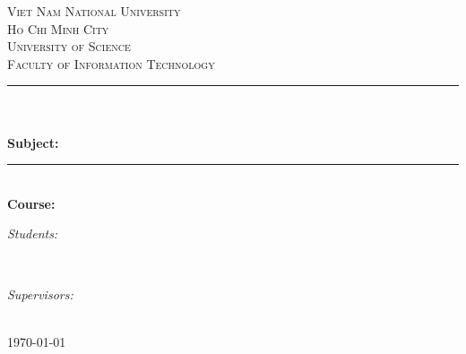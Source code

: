 \begin{titlepage}
\newcommand{\HRule}{\rule{\linewidth}{0.5mm}}
\centering

\textsc{\LARGE Viet Nam National University}\\[0.5cm]
\textsc{\LARGE Ho Chi Minh City}\\[0.5cm]
\textsc{\Large University of Science}\\[0.5cm]
\textsc{\large Faculty of Information Technology}\\[0.5cm]

\HRule \\[0.4cm]
{ 
\huge{\bfseries{\reporttitle}}\\[0.5cm]
\large{\bfseries{Subject: \reportname}}
}\\[0.4cm]
\HRule \\[0.5cm]

\textbf{\large Course: \coursename}\\[0.5cm]

\begin{minipage}[t]{0.5\textwidth} %
\begin{flushleft} \large
\emph{Students:}\\
\studentname
\end{flushleft}
\end{minipage}
~
\begin{minipage}[t]{0.4\textwidth} %
\begin{flushright} \large
\emph{Supervisors:} \\
\teachername
\end{flushright}
\end{minipage}\\[1cm]

{\large \today}\\[1cm]


\vfill
\end{titlepage}
